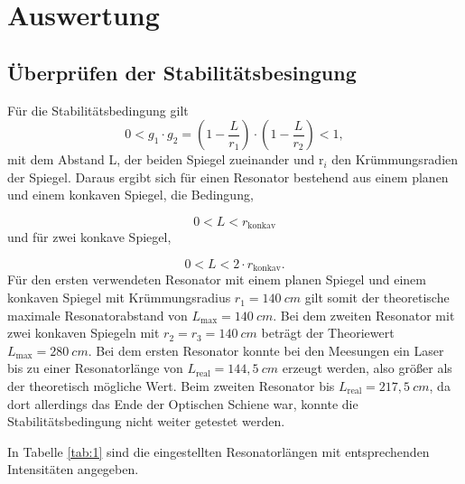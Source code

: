 \section{Auswertung}
\label{sec:Auswertung}

\subsection{Überprüfen der Stabilitätsbesingung}
\label{sec:Überprüfen der Stabilitätsbesingung}

Für die Stabilitätsbedingung gilt 
\begin{equation}
  0 < g_1 \cdot g_2 = \left(1 - \frac{L}{r_1}\right) \cdot \left(1- \frac{L}{r_2}\right) < 1,
\end{equation}
mit dem Abstand L, der beiden Spiegel zueinander und r$_i$ den Krümmungsradien der Spiegel.
Daraus ergibt sich für einen Resonator bestehend aus einem planen und einem konkaven Spiegel, 
die Bedingung,

\begin{equation}
\label{equ:}
  0 < L < r_{\text{konkav}}
\end{equation}
und für zwei konkave Spiegel,

\begin{equation}
\label{equ:}
  0 < L < 2 \cdot r_{\text{konkav}}.
\end{equation}
Für den ersten verwendeten Resonator mit einem planen Spiegel und einem konkaven Spiegel mit Krümmungsradius $r_1 = 140 \: cm$ gilt somit der 
theoretische maximale Resonatorabstand von $L_{\text{max}} = 140 \: cm$.
Bei dem zweiten Resonator mit zwei konkaven Spiegeln mit $r_2 = r_3 = 140 \: cm$ beträgt der Theoriewert $L_{\text{max}} = 280 \: cm$.
Bei dem ersten Resonator konnte bei den Meesungen ein Laser bis zu einer Resonatorlänge von $L_{\text{real}} = 144,5 \: cm$ erzeugt werden,
also größer als der theoretisch mögliche Wert.
Beim zweiten Resonator bis $L_{\text{real}} = 217,5 \: cm$, da dort allerdings das Ende der Optischen Schiene war, konnte die Stabilitätsbedingung nicht weiter getestet werden.

In Tabelle \ref{tab:1} sind die eingestellten Resonatorlängen mit entsprechenden Intensitäten angegeben.


